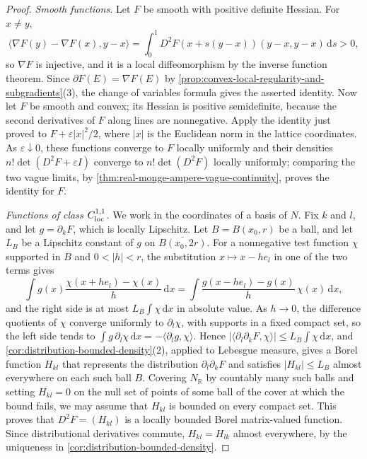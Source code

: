 \begin{proof}
\emph{Smooth functions.} Let $F$ be smooth with positive definite Hessian. For $x\neq y$,
\[
 \langle\nabla F(y)-\nabla F(x),y-x\rangle=\int_0^1D^2F(x+s(y-x))(y-x,y-x)\,\mathrm ds>0,
\]
so $\nabla F$ is injective, and it is a local diffeomorphism by the inverse function theorem. Since $\partial F(E)=\nabla F(E)$ by \cref{prop:convex-local-regularity-and-subgradients}(3), the change of variables formula gives the asserted identity. Now let $F$ be smooth and convex; its Hessian is positive semidefinite, because the second derivatives of $F$ along lines are nonnegative. Apply the identity just proved to $F+\varepsilon|x|^2/2$, where $|x|$ is the Euclidean norm in the lattice coordinates. As $\varepsilon\downarrow0$, these functions converge to $F$ locally uniformly and their densities $n!\det(D^2F+\varepsilon I)$ converge to $n!\det(D^2F)$ locally uniformly; comparing the two vague limits, by \cref{thm:real-monge-ampere-vague-continuity}, proves the identity for $F$.

\emph{Functions of class $C^{1,1}_{\mathrm{loc}}$.} We work in the coordinates of a basis of $N$. Fix $k$ and $l$, and let $g=\partial_kF$, which is locally Lipschitz. Let $B=B(x_0,r)$ be a ball, and let $L_B$ be a Lipschitz constant of $g$ on $\overline{B(x_0,2r)}$. For a nonnegative test function $\chi$ supported in $B$ and $0<|h|<r$, the substitution $x\mapsto x-he_l$ in one of the two terms gives
\[
 \int g(x)\frac{\chi(x+he_l)-\chi(x)}h\,\mathrm dx=\int\frac{g(x-he_l)-g(x)}h\,\chi(x)\,\mathrm dx,
\]
and the right side is at most $L_B\int\chi\,\mathrm dx$ in absolute value. As $h\to0$, the difference quotients of $\chi$ converge uniformly to $\partial_l\chi$, with supports in a fixed compact set, so the left side tends to $\int g\,\partial_l\chi\,\mathrm dx=-\langle\partial_lg,\chi\rangle$. Hence $|\langle\partial_l\partial_kF,\chi\rangle|\leq L_B\int\chi\,\mathrm dx$, and \cref{cor:distribution-bounded-density}(2), applied to Lebesgue measure, gives a Borel function $H_{kl}$ that represents the distribution $\partial_l\partial_kF$ and satisfies $|H_{kl}|\leq L_B$ almost everywhere on each such ball $B$. Covering $N_{\mathbb R}$ by countably many such balls and setting $H_{kl}=0$ on the null set of points of some ball of the cover at which the bound fails, we may assume that $H_{kl}$ is bounded on every compact set. This proves that $D^2F=(H_{kl})$ is a locally bounded Borel matrix-valued function. Since distributional derivatives commute, $H_{kl}=H_{lk}$ almost everywhere, by the uniqueness in \cref{cor:distribution-bounded-density}.


\end{proof}
